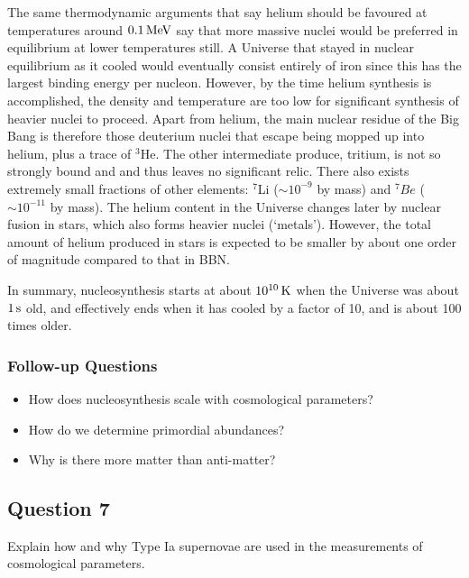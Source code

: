 \documentclass[a4paper,11pt]{article}
\begin{document}
{\noindent}The same thermodynamic arguments that say helium should be favoured at temperatures around $0.1\,{\rm MeV}$ say that more massive nuclei would be preferred in equilibrium at lower temperatures still. A Universe that stayed in nuclear equilibrium as it cooled would eventually consist entirely of iron since this has the largest binding energy per nucleon. However, by the time helium synthesis is accomplished, the density and temperature are too low for significant synthesis of heavier nuclei to proceed. Apart from helium, the main nuclear residue of the Big Bang is therefore those deuterium nuclei that escape being mopped up into helium, plus a trace of $^3$He. The other intermediate produce, tritium, is not so strongly bound and and thus leaves no significant relic. There also exists extremely small fractions of other elements: $^7$Li ($\sim10^{-9}$ by mass) and $^7Be$ ($\sim10^{-11}$ by mass). The helium content in the Universe changes later by nuclear fusion in stars, which also forms heavier nuclei (`metals'). However, the total amount of helium produced in stars is expected to be smaller by about one order of magnitude compared to that in BBN.

{\noindent}In summary, nucleosynthesis starts at about $10^{10}\,{\rm K}$ when the Universe was about $1\,{\rm s}$ old, and effectively ends when it has cooled by a factor of 10, and is about 100 times older.

\subsubsection{Follow-up Questions}

\begin{itemize}
    \item How does nucleosynthesis scale with cosmological parameters? 
    \item How do we determine primordial abundances?
    \item Why is there more matter than anti-matter?
\end{itemize}

%
%

\newpage
\subsection{Question 7}

Explain how and why Type Ia supernovae are used in the measurements of cosmological parameters.
\end{document}
